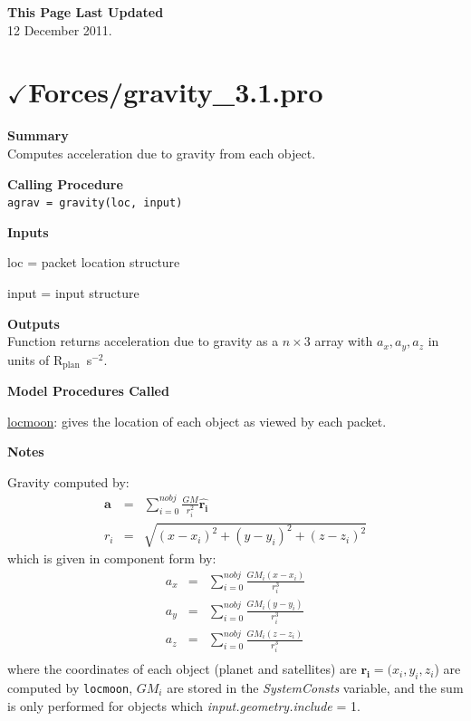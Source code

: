 \documentclass[11pt]{article}
\newcommand\descrip[1]{\textsf{\textbf{\large{#1}}}\\}
\newcommand\Rplan{R$_{\mathrm{plan}}$}
\begin{document}
\descrip{This Page Last Updated}
12 December 2011.

\clearpage

\section{$\checkmark$Forces/gravity\_3.1.pro} \label{sec:gravity}

\descrip{Summary}
Computes acceleration due to gravity from each object.

\descrip{Calling Procedure}
\verb+agrav = gravity(loc, input)+

\descrip{Inputs}
\begin{compactenum} \listup
\item loc = packet location structure
\item input = input structure
\end{compactenum}

\descrip{Outputs}
Function returns acceleration due to gravity as a $n\times3$ array with 
$a_x, a_y, a_z$ in units of \Rplan\ s$^{-2}$.

\descrip{Model Procedures Called}
\begin{compactenum} \listup
\item \hyperref[sec:locmoon]{locmoon}: gives the location of each object as 
viewed by each packet. 
\end{compactenum}

\descrip{Notes}
\begin{compactenum} \listup
\item Gravity computed by:
\begin{eqnarray}
\mathbf{a} & = & \sum_{i=0}^{nobj} \frac{GM}{r_i^2} \mathbf{\hat{r_i}} \\
r_i & = & \sqrt{(x-x_i)^2 + (y-y_i)^2 + (z-z_i)^2}
\end{eqnarray}
which is given in component form by:
\begin{eqnarray}
a_x & = & \sum_{i=0}^{nobj} \frac{GM_i (x-x_i)}{r_i^3} \\
a_y & = & \sum_{i=0}^{nobj} \frac{GM_i (y-y_i)}{r_i^3} \\
a_z & = & \sum_{i=0}^{nobj} \frac{GM_i (z-z_i)}{r_i^3} \\
\end{eqnarray}
where the coordinates of each object (planet and satellites) are
$\mathbf{r_i} = (x_i,y_i,z_i$) are computed by \texttt{locmoon}, $GM_i$ are 
stored in the
\textit{SystemConsts} variable, and the sum is only performed for objects which
\textit{input.geometry.include} = 1. 
\end{compactenum}
\end{document}
